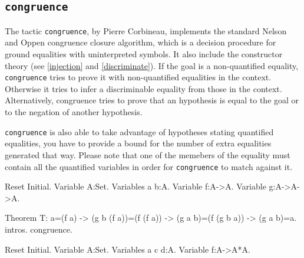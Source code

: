 
\subsection{\tt congruence
\label{congruence}}

The tactic {\tt congruence}, by Pierre Corbineau, implements the standard Nelson and Oppen
congruence closure algorithm, which is a decision procedure for ground
equalities with uninterpreted symbols. It also include the constructor theory
(see \ref{injection} and \ref{discriminate}).
If the goal is a non-quantified equality, {\tt congruence} tries to
prove it with non-quantified equalities in the context. Otherwise it
tries to infer a discriminable equality from those in the context. Alternatively, congruence tries to prove that an hypothesis is equal to the goal or to the negation of another hypothesis.

{\tt congruence} is also able to take advantage of hypotheses stating quantified equalities, you have to provide a bound for the number of extra equalities generated that way. Please note that one of the memebers of the equality must contain all the quantified variables in order for {\tt congruence} to match against it. 

\begin{coq_eval}
Reset Initial.
Variable A:Set.
Variables a b:A.
Variable f:A->A.
Variable g:A->A->A.
\end{coq_eval}

\begin{coq_example}
Theorem T: 
  a=(f a) -> (g b (f a))=(f (f a)) -> (g a b)=(f (g b a)) -> (g a b)=a.
intros.
congruence.
\end{coq_example}

\begin{coq_eval}
Reset Initial.
Variable A:Set.
Variables a c d:A.
Variable f:A->A*A.
\end{coq_eval}

